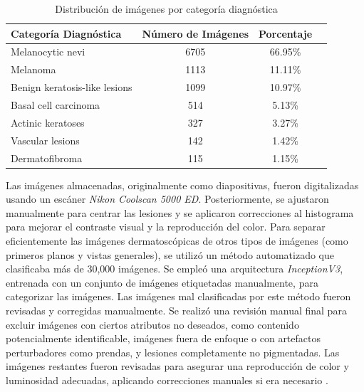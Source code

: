 \begin{table}[ht]
   \centering
   \begin{tabular}{lccc}
   \hline
   \textbf{Categoría Diagnóstica} & \textbf{Número de Imágenes} & \textbf{Porcentaje} \\
   \hline
   Melanocytic nevi               & 6705                        & 66.95\%             \\
   Melanoma                       & 1113                        & 11.11\%             \\
   Benign keratosis-like lesions  & 1099                        & 10.97\%             \\
   Basal cell carcinoma           & 514                         & 5.13\%              \\
   Actinic keratoses              & 327                         & 3.27\%              \\
   Vascular lesions               & 142                         & 1.42\%              \\
   Dermatofibroma                 & 115                         & 1.15\%              \\
   \hline
   \end{tabular}
   \caption{Distribución de imágenes por categoría diagnóstica}
   \label{tab:ham10000_distribution}
\end{table}   
   
Las imágenes almacenadas, originalmente como diapositivas, fueron digitalizadas usando un escáner \textit{Nikon Coolscan 5000 ED}. Posteriormente, se ajustaron manualmente para centrar las lesiones y se aplicaron correcciones al histograma para mejorar el contraste visual y la reproducción del color. Para separar eficientemente las imágenes dermatoscópicas de otros tipos de imágenes (como primeros planos y vistas generales), se utilizó un método automatizado que clasificaba más de 30,000 imágenes. Se empleó una arquitectura \textit{InceptionV3}, entrenada con un conjunto de imágenes etiquetadas manualmente, para categorizar las imágenes. Las imágenes mal clasificadas por este método fueron revisadas y corregidas manualmente.  Se realizó una revisión manual final para excluir imágenes con ciertos atributos no deseados, como contenido potencialmente identificable, imágenes fuera de enfoque o con artefactos perturbadores como prendas, y lesiones completamente no pigmentadas. Las imágenes restantes fueron revisadas para asegurar una reproducción de color y luminosidad adecuadas, aplicando correcciones manuales si era necesario . 



